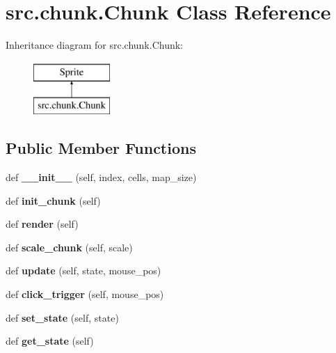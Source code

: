 \hypertarget{classsrc_1_1chunk_1_1_chunk}{}\section{src.\+chunk.\+Chunk Class Reference}
\label{classsrc_1_1chunk_1_1_chunk}
Inheritance diagram for src.\+chunk.\+Chunk\+:\begin{figure}[H]
\begin{center}
\leavevmode
\includegraphics[height=2.000000cm]{classsrc_1_1chunk_1_1_chunk}
\end{center}
\end{figure}
\subsection*{Public Member Functions}
\begin{DoxyCompactItemize}
\item 
\hypertarget{classsrc_1_1chunk_1_1_chunk_a8c9d18c8f0a671eae1550be6a71ec601}{}\label{classsrc_1_1chunk_1_1_chunk_a8c9d18c8f0a671eae1550be6a71ec601} 
def {\bfseries \+\_\+\+\_\+init\+\_\+\+\_\+} (self, index, cells, map\+\_\+size)
\item 
\hypertarget{classsrc_1_1chunk_1_1_chunk_ae6288132916e7fc44c45be53bc45290d}{}\label{classsrc_1_1chunk_1_1_chunk_ae6288132916e7fc44c45be53bc45290d} 
def {\bfseries init\+\_\+chunk} (self)
\item 
\hypertarget{classsrc_1_1chunk_1_1_chunk_acc2e40e854393a245038db7f763dabca}{}\label{classsrc_1_1chunk_1_1_chunk_acc2e40e854393a245038db7f763dabca} 
def {\bfseries render} (self)
\item 
\hypertarget{classsrc_1_1chunk_1_1_chunk_a23805ac7584fdc45dbc4a484764095e8}{}\label{classsrc_1_1chunk_1_1_chunk_a23805ac7584fdc45dbc4a484764095e8} 
def {\bfseries scale\+\_\+chunk} (self, scale)
\item 
\hypertarget{classsrc_1_1chunk_1_1_chunk_a271c26165374611c3a20737a19358a4c}{}\label{classsrc_1_1chunk_1_1_chunk_a271c26165374611c3a20737a19358a4c} 
def {\bfseries update} (self, state, mouse\+\_\+pos)
\item 
\hypertarget{classsrc_1_1chunk_1_1_chunk_a1ff98b0d6cb9f3d86c3269f332336407}{}\label{classsrc_1_1chunk_1_1_chunk_a1ff98b0d6cb9f3d86c3269f332336407} 
def {\bfseries click\+\_\+trigger} (self, mouse\+\_\+pos)
\item 
\hypertarget{classsrc_1_1chunk_1_1_chunk_aa4f3ed587b9f51a9ae6faa2608c23b38}{}\label{classsrc_1_1chunk_1_1_chunk_aa4f3ed587b9f51a9ae6faa2608c23b38} 
def {\bfseries set\+\_\+state} (self, state)
\item 
\hypertarget{classsrc_1_1chunk_1_1_chunk_aae7ffc5d4147ed8444b6e343ed5cffb2}{}\label{classsrc_1_1chunk_1_1_chunk_aae7ffc5d4147ed8444b6e343ed5cffb2} 
def {\bfseries get\+\_\+state} (self)
\end{DoxyCompactItemize}
